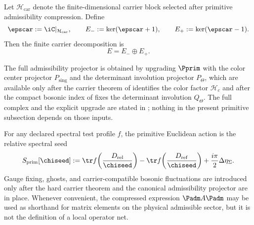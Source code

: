 \begin{definition}
\label{def:carrier-polarization-involution}
Let $\mathcal H_{\mathrm{car}}$ denote the finite-dimensional carrier block selected after
primitive admissibility compression. Define
\[
\epscar:=\iC|_{\mathcal H_{\mathrm{car}}},
\qquad
E_-:=\ker(\epscar+1),
\qquad
E_+:=\ker(\epscar-1).
\]
Then the finite carrier decomposition is
\[
E=E_-\oplus E_+.
\]
\end{definition}

\begin{remark}
\label{rem:forward-Padm}
The full admissibility projector is obtained by upgrading $\Pprim$ with the color center
projector $P_{\mathrm{sing}}$ and the determinant involution projector $P_\Theta$, which are
available only after the carrier theorem of  identifies the
color factor $\mathcal H_c$ and after the compact bosonic index of 
fixes the determinant involution $Q_\Theta$. The full complex and the explicit upgrade are
stated in ; nothing in the present
primitive subsection depends on those inputs.
\end{remark}

\begin{definition}
For any declared spectral test profile $f$, the primitive Euclidean action is the relative
spectral seed
\[
S_{\mathrm{prim}}[\chiseed]
:=
\tr f\!\left(\frac{D_{\mathrm{rel}}}{\chiseed}\right)
-
\tr f\!\left(\frac{D_{\mathrm{ref}}}{\chiseed}\right)
+\frac{i\pi}{2}\Delta\eta_\Sigma.
\]
Gauge fixing, ghosts, and carrier-compatible bosonic fluctuations are introduced only after the
hard carrier theorem and the canonical admissibility projector are in place. Whenever convenient,
the compressed expression $\Padm A\Padm$ may be used as shorthand for matrix elements on the
physical admissible sector, but it is not the definition of a local operator net.
\end{definition}

